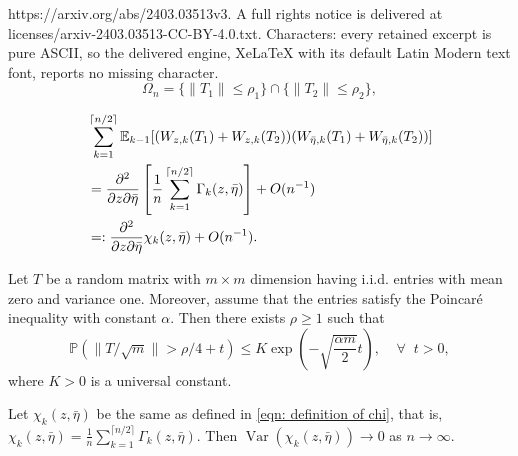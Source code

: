 \documentclass[10pt,a4paper]{amsart}
\newcommand{\Var}{\operatorname{Var}}
\begin{document}
https://arxiv.org/abs/2403.03513v3. A full rights notice is delivered at licenses/arxiv-2403.03513-CC-BY-4.0.txt. Characters: every retained excerpt is pure ASCII, so the delivered engine, XeLaTeX with its default Latin Modern text font, reports no missing character.
\begin{equation}
\Omega_{n} = \{\|T_1\| \leq \rho_1 \} \cap \{\|T_2\| \leq \rho_2 \} \label{eqn: event that T_1, T_2 are bounded},
\end{equation}

\begin{align}
    &\sum_{k=1}^{\lceil n/2 \rceil}\mathbb{E}_{k-1}[(W_{z,k}(T_1)+W_{z,k}(T_2))(W_{\bar{\eta},k}(T_1)+W_{\bar{\eta},k}(T_2))]\notag\\
    &= \frac{\partial^2}{\partial z \partial \bar{\eta}}\left[\frac{1}{n}\sum _{k=1}^{\lceil n/2 \rceil}\Gamma_{k}(z,\bar{\eta})\right]+O(n^{-1}) \notag\\
    &=: \frac{\partial^2}{\partial z \partial \bar{\eta}}\chi_{k}(z,\bar{\eta})+O(n^{-1})\label{eqn: definition of chi}.
\end{align}

\begin{appendixlemma}\label{lemma:Norm bound}
    Let $T$ be a  random matrix with $m \times m$ dimension having i.i.d. entries with mean zero and variance one. Moreover, assume that the entries satisfy the Poincar\'e inequality with constant $\alpha$. Then there exists $\rho\geq1$ such that 
    $$
    \mathbb{P}(\|T/\sqrt{m}\|>\rho/4+t) \leq K \exp\left(-\sqrt{\frac{\alpha m}{2}}t\right),\;\;\;\; \forall \;\; t>0,
    $$
    where $K>0$ is a universal constant.
\end{appendixlemma}

\begin{lemma}
    Let $\chi_{k}(z, \bar{\eta})$ be the same as defined in \eqref{eqn: definition of chi}, that is, $\chi_{k}(z, \bar{\eta}) = \frac{1}{n}\sum _{k=1}^{\lceil n/2 \rceil}\Gamma_{k}(z,\bar{\eta}).$ Then $\Var(\chi_{k}(z, \bar\eta))\to 0$ as $n\to\infty.$
\end{lemma}
\end{document}
